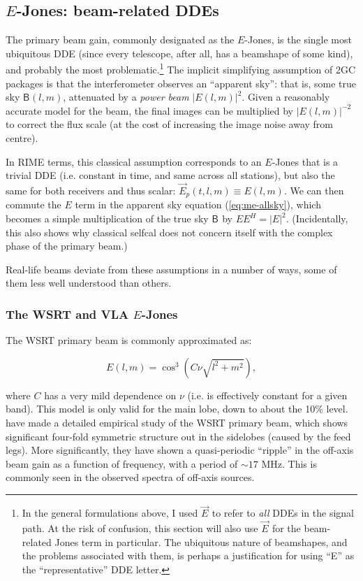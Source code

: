 \documentclass{aa}
\newcommand{\herm}{H}
\newcommand{\jones}[2]{\vec {#1}_{#2}}
\newcommand{\coh}[2]{\mathsf{{#1}}_{{#2}}}
\begin{document}
\subsection{$E$-Jones: beam-related DDEs\label{sec:EJones}}

The primary beam gain, commonly designated as the $E$-Jones, is the single most ubiquitous DDE (since every telescope, after all, has a beamshape of some kind), and probably the most problematic.\footnote{In the general formulations above, I used $\jones{E}{}$ to refer to {\em all} DDEs in the signal path. At the risk of confusion, this section will also use  $\jones{E}{}$ for the beam-related Jones term in particular. The ubiquitous nature of beamshapes, and the problems associated with them, is perhaps a justification for using ``E'' as the ``representative'' DDE letter.} The implicit simplifying assumption of 2GC packages is that the interferometer observes an ``apparent sky'': that is, some true sky $\coh{B}{}(l,m)$, attenuated by a {\em power beam} $|E(l,m)|^2$. Given a reasonably accurate model for the beam, the final images can be multiplied by $|E(l,m)|^{-2}$ to correct the flux scale (at the cost of increasing the image noise away from centre).

In RIME terms, this classical assumption corresponds to an $E$-Jones that is a trivial DDE (i.e. constant in time, and same across all stations), but also the same for both receivers and thus scalar: $\jones{E}{p}(t,l,m) \equiv E(l,m)$. We can then commute the $E$ term in the apparent sky equation (\ref{eq:me-allsky}), which becomes
a simple multiplication of the true sky $\coh{B}{}$ by $EE^\herm=|E|^2.$ (Incidentally, this also shows why classical selfcal does not concern itself with the complex phase of the primary beam.) 

Real-life beams deviate from these assumptions in a number of ways, some of them less well understood than others.

\subsubsection{The WSRT and VLA $E$-Jones\label{sec:EJones:wsrt}\label{sec:EJones:vla}}

The WSRT primary beam is commonly approximated as:

\[
E(l,m) = \cos^3(C\nu\sqrt{l^2+m^2}),
\]

where $C$ has a very mild dependence on $\nu$ (i.e. is effectively constant for a given band). This model is only valid for the main lobe, down to about the 10\% level. \citet{Popping-Braun:WSRT-beam} have made a detailed empirical study of the WSRT primary beam, which shows significant four-fold symmetric structure out in the sidelobes (caused by the feed legs). More significantly, they have shown a quasi-periodic ``ripple'' in the off-axis beam gain as a function of frequency, with a period of $\sim17$ MHz. This is commonly seen in the observed spectra of off-axis sources.
\end{document}
